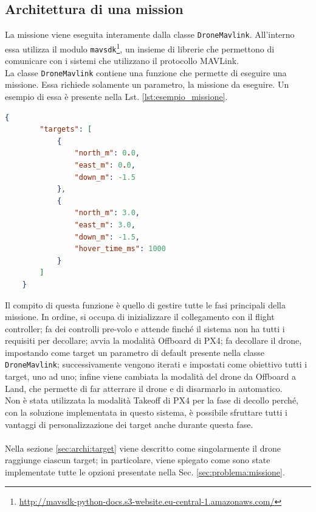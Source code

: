 \subsection{Architettura di una mission}
La missione viene eseguita interamente dalla classe \texttt{DroneMavlink}. All'interno essa utilizza il modulo \texttt{mavsdk}\footnote{\url{http://mavsdk-python-docs.s3-website.eu-central-1.amazonaws.com/}}, un insieme di librerie che permettono di comunicare con i sistemi che utilizzano il protocollo MAVLink. \\
La classe \texttt{DroneMavlink} contiene una funzione che permette di eseguire una missione. Essa richiede solamente un parametro, la missione da eseguire. Un esempio di essa è presente nella Lst. \ref{lst:esempio_missione}.
\begin{lstlisting}[language=json, caption={Esempio di configurazione della missione}, label={lst:esempio_missione}]
	{
		"targets": [
			{
				"north_m": 0.0,
				"east_m": 0.0,
				"down_m": -1.5
			},
			{
				"north_m": 3.0,
				"east_m": 3.0,
				"down_m": -1.5,
				"hover_time_ms": 1000
			}
		]
	}
\end{lstlisting}
Il compito di questa funzione è quello di gestire tutte le fasi principali della missione. In ordine, si occupa di inizializzare il collegamento con il flight controller; fa dei controlli pre-volo e attende finché il sistema non ha tutti i requisiti per decollare; avvia la modalità Offboard di PX4; fa decollare il drone, impostando come target un parametro di default presente nella classe \texttt{DroneMavlink}; successivamente vengono iterati e impostati come obiettivo tutti i target, uno ad uno; infine viene cambiata la modalità del drone da Offboard a Land, che permette di far atterrare il drone e di disarmarlo in automatico. \\
Non è stata utilizzata la modalità Takeoff di PX4 per la fase di decollo perché, con la soluzione implementata in questo sistema, è possibile sfruttare tutti i vantaggi di personalizzazione dei target anche durante questa fase. \\ \\
Nella sezione \ref{sec:archi:target} viene descritto come singolarmente il drone raggiunge ciascun target; in particolare, viene spiegato come sono state implementate tutte le opzioni presentate nella Sec. \ref{sec:problema:missione}.

